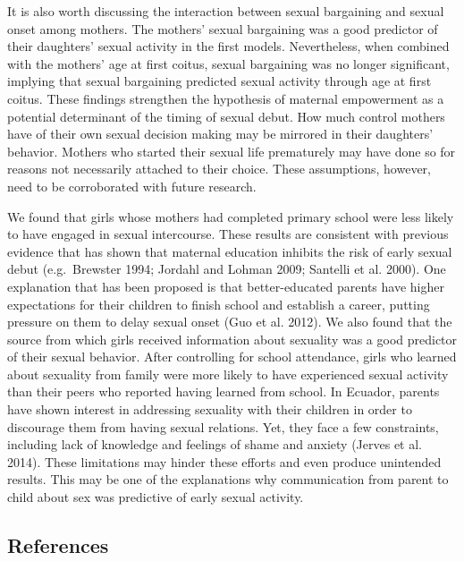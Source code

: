 \documentclass[
]{article}
\begin{document}
It is also worth discussing the interaction between sexual bargaining
and sexual onset among mothers. The mothers' sexual bargaining was a
good predictor of their daughters' sexual activity in the first models.
Nevertheless, when combined with the mothers' age at first coitus,
sexual bargaining was no longer significant, implying that sexual
bargaining predicted sexual activity through age at first coitus. These
findings strengthen the hypothesis of maternal empowerment as a
potential determinant of the timing of sexual debut. How much control
mothers have of their own sexual decision making may be mirrored in
their daughters' behavior. Mothers who started their sexual life
prematurely may have done so for reasons not necessarily attached to
their choice. These assumptions, however, need to be corroborated with
future research.

We found that girls whose mothers had completed primary school were less
likely to have engaged in sexual intercourse. These results are
consistent with previous evidence that has shown that maternal education
inhibits the risk of early sexual debut (e.g.~Brewster 1994; Jordahl and
Lohman 2009; Santelli et al. 2000). One explanation that has been
proposed is that better-educated parents have higher expectations for
their children to finish school and establish a career, putting pressure
on them to delay sexual onset (Guo et al. 2012). We also found that the
source from which girls received information about sexuality was a good
predictor of their sexual behavior. After controlling for school
attendance, girls who learned about sexuality from family were more
likely to have experienced sexual activity than their peers who reported
having learned from school. In Ecuador, parents have shown interest in
addressing sexuality with their children in order to discourage them
from having sexual relations. Yet, they face a few constraints,
including lack of knowledge and feelings of shame and anxiety (Jerves et
al. 2014). These limitations may hinder these efforts and even produce
unintended results. This may be one of the explanations why
communication from parent to child about sex was predictive of early
sexual activity.

\hypertarget{references}{%
\subsection*{References}\label{references}}
\end{document}
